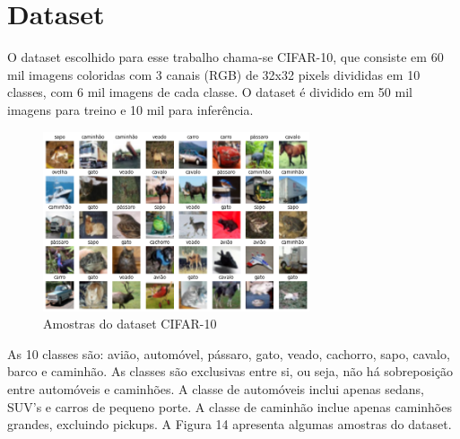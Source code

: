 



\section{Dataset} \label{secao2}

O dataset escolhido para esse trabalho chama-se CIFAR-10, que consiste em 60 mil imagens coloridas com 3 canais (RGB) de 32x32 pixels divididas em 10 classes, com 6 mil imagens de cada classe. O dataset é dividido em 50 mil imagens para treino e 10 mil para inferência. 

\begin{figure}[H]
	\includegraphics[width=0.7\textwidth, keepaspectratio=true]{figuras/cifar10ex.png}
	\centering
	\caption[Amostras do dataset CIFAR-10]{Amostras do dataset CIFAR-10}
\end{figure}




As 10 classes são: avião, automóvel, pássaro, gato, veado, cachorro, sapo, cavalo, barco e caminhão. As classes são exclusivas entre si, ou seja, não há sobreposição entre automóveis e caminhões. A classe de automóveis inclui apenas sedans, SUV's e carros de pequeno porte. A classe de caminhão inclue apenas caminhões grandes, excluindo pickups. A Figura 14 apresenta algumas amostras do dataset.